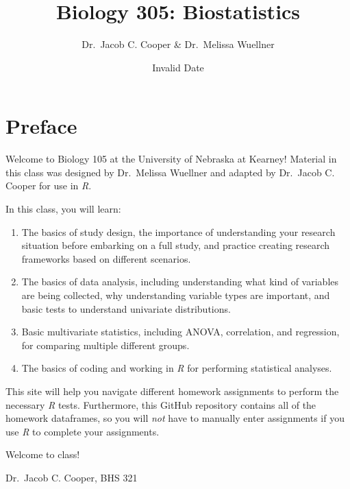 \documentclass[
  letterpaper,
  DIV=11,
  numbers=noendperiod]{scrreprt}
\title{Biology 305: Biostatistics}
\author{Dr.~Jacob C. Cooper \& Dr.~Melissa Wuellner}
\date{Invalid Date}
\providecommand{\tightlist}{%
  \setlength{\itemsep}{0pt}\setlength{\parskip}{0pt}}\usepackage{longtable,booktabs,array}
\renewcommand*\contentsname{Table of contents}
\newcommand\contentsname{Table of contents}
\begin{document}
\maketitle

\renewcommand*\contentsname{Table of contents}
{
\hypersetup{linkcolor=}
\setcounter{tocdepth}{2}
\tableofcontents
}


\chapter*{Preface}\label{preface}


Welcome to Biology 105 at the University of Nebraska at Kearney!
Material in this class was designed by Dr.~Melissa Wuellner and adapted
by Dr.~Jacob C. Cooper for use in \emph{R}.

In this class, you will learn:

\begin{enumerate}
\def\labelenumi{\arabic{enumi}.}
\tightlist
\item
  The basics of study design, the importance of understanding your
  research situation before embarking on a full study, and practice
  creating research frameworks based on different scenarios.
\item
  The basics of data analysis, including understanding what kind of
  variables are being collected, why understanding variable types are
  important, and basic tests to understand univariate distributions.
\item
  Basic multivariate statistics, including ANOVA, correlation, and
  regression, for comparing multiple different groups.
\item
  The basics of coding and working in \emph{R} for performing
  statistical analyses.
\end{enumerate}

This site will help you navigate different homework assignments to
perform the necessary \emph{R} tests. Furthermore, this GitHub
repository contains all of the homework dataframes, so you will
\emph{not} have to manually enter assignments if you use \emph{R} to
complete your assignments.

Welcome to class!

Dr.~Jacob C. Cooper, BHS 321

\end{document}
